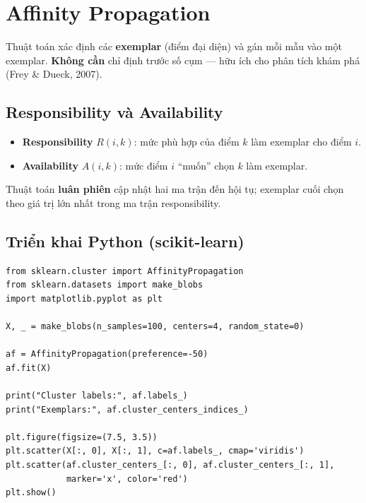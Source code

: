 \section{Affinity Propagation}
\label{sec:affinity-propagation}

\begin{dinhnghia}[title={Affinity Propagation}]
Thuật toán xác định các \textbf{exemplar} (điểm đại diện) và gán mỗi mẫu vào một exemplar.
\textbf{Không cần} chỉ định trước số cụm --- hữu ích cho phân tích khám phá (Frey \& Dueck, 2007).
\end{dinhnghia}

\subsection{Responsibility và Availability}

\begin{phuongphap}[title={Hai ma trận lặp}]
\begin{itemize}
  \item \textbf{Responsibility} $R(i,k)$: mức phù hợp của điểm $k$ làm exemplar cho điểm $i$.
  \item \textbf{Availability} $A(i,k)$: mức điểm $i$ ``muốn'' chọn $k$ làm exemplar.
\end{itemize}
Thuật toán \textbf{luân phiên} cập nhật hai ma trận đến hội tụ; exemplar cuối chọn theo giá trị lớn nhất trong ma trận responsibility.
\end{phuongphap}

\subsection{Triển khai Python (scikit-learn)}

\begin{vidu}[title={Ví dụ AffinityPropagation}]
\begin{lstlisting}
from sklearn.cluster import AffinityPropagation
from sklearn.datasets import make_blobs
import matplotlib.pyplot as plt

X, _ = make_blobs(n_samples=100, centers=4, random_state=0)

af = AffinityPropagation(preference=-50)
af.fit(X)

print("Cluster labels:", af.labels_)
print("Exemplars:", af.cluster_centers_indices_)

plt.figure(figsize=(7.5, 3.5))
plt.scatter(X[:, 0], X[:, 1], c=af.labels_, cmap='viridis')
plt.scatter(af.cluster_centers_[:, 0], af.cluster_centers_[:, 1],
            marker='x', color='red')
plt.show()
\end{lstlisting}
\end{vidu}

